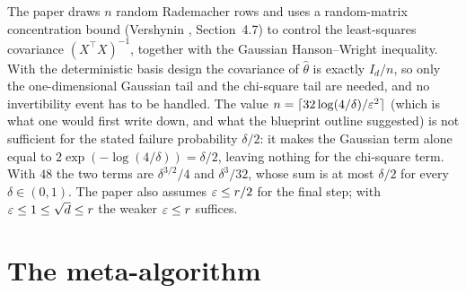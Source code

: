 \begin{remark}\label{rem:norm_large_design}
The paper draws $n$ random Rademacher rows and uses a random-matrix concentration bound
(Vershynin \cite{vershynin2018high}, Section~4.7) to control the least-squares covariance
$(X^\top X)^{-1}$, together with the Gaussian Hanson--Wright inequality. With the
deterministic basis design the covariance of $\hat\theta$ is exactly $I_d/n$, so only the
one-dimensional Gaussian tail and the chi-square tail are needed, and no invertibility
event has to be handled. The value $n = \lceil 32\log(4/\delta)/\varepsilon^2\rceil$ (which is what
one would first write down, and what the blueprint outline suggested) is not sufficient
for the stated failure probability $\delta/2$: it makes the Gaussian term alone equal to
$2\exp(-\log(4/\delta)) = \delta/2$, leaving nothing for the chi-square term. With $48$ the
two terms are $\delta^{3/2}/4$ and $\delta^3/32$, whose sum is at most $\delta/2$ for every
$\delta \in (0,1)$. The paper also assumes $\varepsilon \le r/2$
for the final step; with $\varepsilon \le 1 \le \sqrt d \le r$ the weaker $\varepsilon \le r$ suffices.
\end{remark}

\section{The meta-algorithm}
\label{sec:norm_meta}

